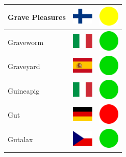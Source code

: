 \documentclass[12pt, a4paper, twoside]{report}
\begin{document}
\begin{center}
\begin{longtable}{|p{5cm}|p{2cm}|p{2cm}|}
Grave Pleasures & \includegraphics[width=1cm]{4x3/fi} & \includegraphics[width=1cm]{likes/m} \\ \hline
Graveworm & \includegraphics[width=1cm]{4x3/it} & \includegraphics[width=1cm]{likes/y} \\ \hline
Graveyard & \includegraphics[width=1cm]{4x3/es} & \includegraphics[width=1cm]{likes/y} \\ \hline
Guineapig & \includegraphics[width=1cm]{4x3/it} & \includegraphics[width=1cm]{likes/y} \\ \hline
Gut & \includegraphics[width=1cm]{4x3/de} & \includegraphics[width=1cm]{likes/n} \\ \hline
Gutalax & \includegraphics[width=1cm]{4x3/cz} & \includegraphics[width=1cm]{likes/y} \\ \hline

\end{longtable}
\end{center}
\end{document}
